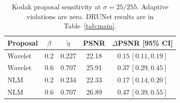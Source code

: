 \begin{table}[t]
\centering
\caption{Kodak proposal sensitivity at $\sigma=25/255$. Adaptive violations are zero. DRUNet results are in Table~\ref{tab:main}.}
\label{tab:proposal}
\setlength{\tabcolsep}{2pt}
\begin{tabular*}{\columnwidth}{@{\extracolsep{\fill}}lcccc@{}}
\toprule
Proposal&$\beta$&$\widetilde\eta$&PSNR&$\Delta$PSNR [95\% CI]\\
\midrule
Wavelet&0.2&0.227&22.18&$0.15\,[0.11,0.19]$\\
Wavelet&0.6&0.707&25.91&$0.37\,[0.29,0.45]$\\
NLM&0.2&0.234&22.33&$0.17\,[0.14,0.20]$\\
NLM&0.6&0.707&26.89&$0.47\,[0.39,0.55]$\\
\bottomrule
\end{tabular*}
\end{table}
